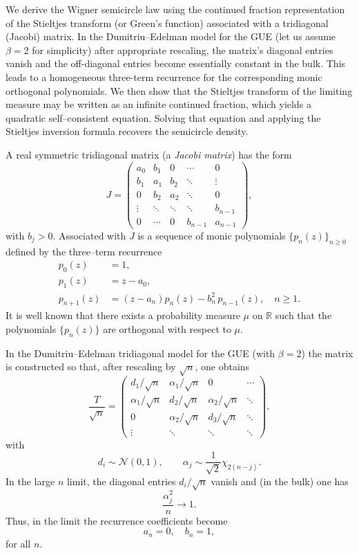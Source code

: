\documentclass[letterpaper,11pt,oneside,reqno]{book}
\numberwithin{equation}{chapter}  %
\theoremstyle{definition}
\begin{document}
We derive the Wigner semicircle law using the continued
fraction representation of the Stieltjes transform (or
Green's function) associated with a tridiagonal (Jacobi)
matrix. In the Dumitriu--Edelman model for the GUE (let us
assume \(\beta=2\) for simplicity) after appropriate
rescaling, the matrix’s diagonal entries vanish and the
off-diagonal entries become essentially constant in the
bulk. This leads to a homogeneous three-term recurrence for
the corresponding monic orthogonal polynomials. We then show
that the Stieltjes transform of the limiting measure may be
written as an infinite continued fraction, which yields a
quadratic self--consistent equation. Solving that equation
and applying the Stieltjes inversion formula recovers the
semicircle density.

A real symmetric tridiagonal matrix (a \emph{Jacobi matrix}) has the form
\[
J = \begin{pmatrix}
a_0 & b_1 & 0 & \cdots & 0 \\
b_1 & a_1 & b_2 & \ddots & \vdots \\
0 & b_2 & a_2 & \ddots & 0 \\
\vdots & \ddots & \ddots & \ddots & b_{n-1} \\
0 & \cdots & 0 & b_{n-1} & a_{n-1}
\end{pmatrix},
\]
with \(b_j>0\). Associated with \(J\) is a sequence of monic polynomials \(\{p_n(z)\}_{n\ge0}\) defined by the three--term recurrence
\begin{equation}\label{lecture4:eq:three-term}
\begin{split}
p_0(z)&=1,\\[1mm]
p_1(z)&=z-a_0,\\[1mm]
p_{n+1}(z)&=(z-a_n)p_n(z)-b_n^2\,p_{n-1}(z),\quad n\ge1.
\end{split}
\end{equation}
It is well known that there exists a probability measure \(\mu\) on \(\mathbb{R}\) such that the polynomials \(\{p_n(z)\}\) are orthogonal with respect to \(\mu\).

\medskip

In the Dumitriu--Edelman tridiagonal model for the GUE (with \(\beta=2\)) the matrix is constructed so that, after rescaling by \(\sqrt{n}\), one obtains
\[
\frac{T}{\sqrt{n}} = \begin{pmatrix}
d_1/\sqrt{n} & \alpha_1/\sqrt{n} & 0 & \cdots\\[1mm]
\alpha_1/\sqrt{n} & d_2/\sqrt{n} & \alpha_2/\sqrt{n} & \ddots\\[1mm]
0 & \alpha_2/\sqrt{n} & d_3/\sqrt{n} & \ddots\\[1mm]
\vdots & \ddots & \ddots & \ddots
\end{pmatrix},
\]
with
\[
d_i\sim\mathcal{N}(0,1),\qquad \alpha_j\sim\frac{1}{\sqrt{2}}\chi_{2(n-j)}.
\]
In the large \(n\) limit, the diagonal entries \(d_i/\sqrt{n}\) vanish and (in the bulk) one has
\[
\frac{\alpha_j^2}{n}\to 1.
\]
Thus, in the limit the recurrence coefficients become
\[
a_n=0,\quad b_n=1,
\]
for all \(n\).
\end{document}

